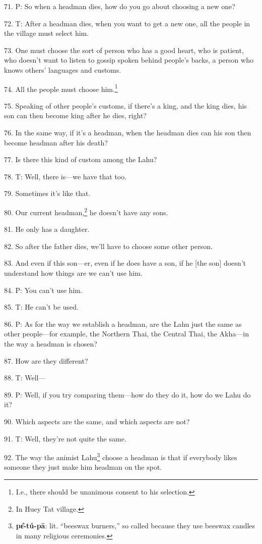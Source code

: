 71. P: So when a headman dies, how do you go about choosing a new one?

72. T: After a headman dies, when you want to get a new one, all the people in
the village must select him.

73. One must choose the sort of person who has a good heart, who is patient, who
doesn't want to listen to gossip spoken behind people's backs, a person who knows
others' languages and customs.

74. All the people must choose him.\footnote{I.e., there should be unanimous consent to his selection.}

75. Speaking of other people's customs, if there's a king, and the king dies, his
son can then become king after he dies, right?

76. In the same way, if it's a headman, when the headman dies can his son then
become headman after his death?

77. Is there this kind of custom among the Lahu?

78. T: Well, there is---we have that too.

79. Sometimes it's like that.

80. Our current headman,\footnote{In Huey Tat village.} he doesn't have any sons.

81. He only has a daughter.

82. So after the father dies, we'll have to choose some other person.

83. And even if this son---er, even if he does have a son, if he [the son] doesn't
understand how things are we can't use him.

84. P: You can't use him.

85. T: He can't be used.

86. P: As for the way we establish a headman, are the Lahu just the same as other
people---for example, the Northern Thai, the Central Thai, the Akha---in the way
a headman is chosen?

87. How are they different?

88. T: Well---

89. P: Well, if you try comparing them---how do they do it, how do we Lahu do it?

90. Which aspects are the same, and which aspects are not?

91. T: Well, they're not quite the same.

92. The way the animist Lahu\footnote{\textbf{pɛ̂-tú-pā}: lit. ``beeswax burners,'' so called because they use beeswax candles in many religious ceremonies.} choose a headman is that if everybody likes someone
they just make him headman on the spot.

